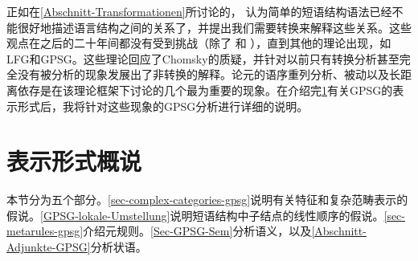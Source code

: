 正如在\ref{Abschnitt-Transformationen}所讨论的， \citet{Chomsky57a}认为简单的短语结构语法已经不能很好地描述语言结构之间的关系了，并提出我们需要转换来解释这些关系。这些观点在之后的二十年间都没有受到挑战（除了 和 ），直到其他的理论出现，如LFG和GPSG。这些理论回应了Chomsky的质疑，并针对以前只有转换分析甚至完全没有被分析的现象发展出了非转换的解释。论元的语序重列分析、被动以及长距离依存是在该理论框架下讨论的几个最为重要的现象。在介绍完\ref{sec-Representationsformat}有关GPSG的表示形式后，我将针对这些现象的GPSG分析进行详细的说明。

\section{表示形式概说}
\label{sec-Representationsformat}

本节分为五个部分。\ref{sec-complex-categories-gpsg}说明有关特征和复杂范畴表示的假说。\ref{GPSG-lokale-Umstellung}说明短语结构中子结点的线性顺序的假说。\ref{sec-metarules-gpsg}介绍元规则。\ref{Sec-GPSG-Sem}分析语义，以及\ref{Abschnitt-Adjunkte-GPSG}分析状语。

